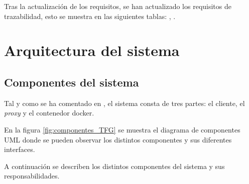 Tras la actualización de los requisitos, se han actualizado los requisitos de trazabilidad, esto se muestra en las siguientes tablas: , .


\begin{table}[htb]
      {\traceabilityFNCA}
  \end{table}

\begin{table}[htb]
      {\traceabilityNFRE}
  \end{table}

\FloatBarrier

\section{Arquitectura del sistema}\label{sec:arquitectura-sistema}

\subsection{Componentes del sistema} \label{sec:componentes-sistema}

Tal y como se ha comentado en , el sistema consta de tres partes: el cliente, el \textit{\gls{proxy}} y el contenedor docker.

En la figura \ref{fig:componentes_TFG} se muestra el diagrama de componentes UML \cite{Cook2017} donde se pueden observar los distintos componentes y sus diferentes interfaces.


A continuación se describen los distintos componentes del sistema y sus responsabilidades.


